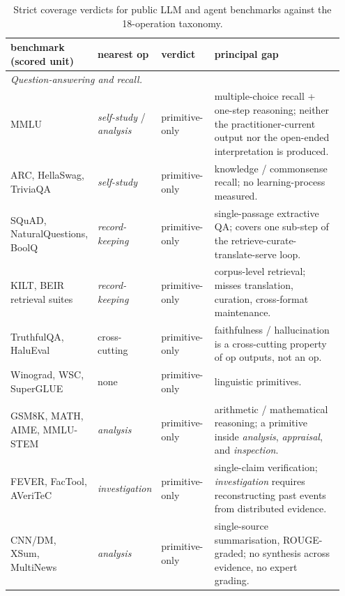 \documentclass{article}
\begin{document}
\begin{table}[!htbp]
\caption{Strict coverage verdicts for public LLM and agent
  benchmarks against the 18-operation taxonomy.}
\label{tab:audit}
\centering
\scriptsize
\setlength{\tabcolsep}{4pt}
\renewcommand{\arraystretch}{1.1}
\begin{tabular}{p{0.21\linewidth} p{0.18\linewidth} p{0.16\linewidth} p{0.40\linewidth}}
\toprule
benchmark (scored unit) & nearest op & verdict & principal gap \\
\midrule
\multicolumn{4}{l}{\textit{Question-answering and recall.}} \\
MMLU                                & \emph{self-study} / \emph{analysis} & primitive-only & multiple-choice recall + one-step reasoning; neither the practitioner-current output nor the open-ended interpretation is produced. \\
ARC, HellaSwag, TriviaQA            & \emph{self-study}                & primitive-only & knowledge / commonsense recall; no learning-process measured. \\
SQuAD, NaturalQuestions, BoolQ      & \emph{record-keeping}            & primitive-only & single-passage extractive QA; covers one sub-step of the retrieve-curate-translate-serve loop. \\
KILT, BEIR retrieval suites         & \emph{record-keeping}            & primitive-only & corpus-level retrieval; misses translation, curation, cross-format maintenance. \\
TruthfulQA, HaluEval                & cross-cutting                       & primitive-only & faithfulness / hallucination is a cross-cutting property of op outputs, not an op. \\
Winograd, WSC, SuperGLUE            & none                                & primitive-only & linguistic primitives. \\
\addlinespace[2pt]
\multicolumn{4}{l}{\textit{Reasoning and verification.}} \\
GSM8K, MATH, AIME, MMLU-STEM        & \emph{analysis}                   & primitive-only & arithmetic / mathematical reasoning; a primitive inside \emph{analysis}, \emph{appraisal}, and \emph{inspection}. \\
FEVER, FacTool, AVeriTeC            & \emph{investigation}              & primitive-only & single-claim verification; \emph{investigation} requires reconstructing past events from distributed evidence. \\
CNN/DM, XSum, MultiNews             & \emph{analysis}                   & primitive-only & single-source summarisation, ROUGE-graded; no synthesis across evidence, no expert grading. \\

\end{tabular}
\end{table}
\end{document}
